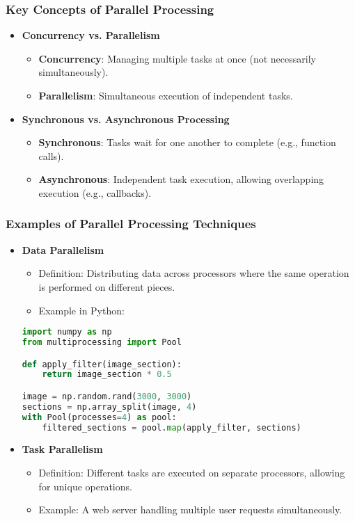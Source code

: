 \documentclass[aspectratio=169]{beamer}
\begin{document}
\begin{frame}
    \frametitle{Key Concepts of Parallel Processing}
    \begin{itemize}
        \item \textbf{Concurrency vs. Parallelism}
            \begin{itemize}
                \item \textbf{Concurrency}: Managing multiple tasks at once (not necessarily simultaneously).
                \item \textbf{Parallelism}: Simultaneous execution of independent tasks.
            \end{itemize}
        \item \textbf{Synchronous vs. Asynchronous Processing}
            \begin{itemize}
                \item \textbf{Synchronous}: Tasks wait for one another to complete (e.g., function calls).
                \item \textbf{Asynchronous}: Independent task execution, allowing overlapping execution (e.g., callbacks).
            \end{itemize}
    \end{itemize}
\end{frame}

\begin{frame}[fragile]
    \frametitle{Examples of Parallel Processing Techniques}
    \begin{itemize}
        \item \textbf{Data Parallelism}
            \begin{itemize}
                \item Definition: Distributing data across processors where the same operation is performed on different pieces.
                \item Example in Python:
            \end{itemize}
            \begin{lstlisting}[language=Python]
import numpy as np
from multiprocessing import Pool

def apply_filter(image_section):
    return image_section * 0.5

image = np.random.rand(3000, 3000)
sections = np.array_split(image, 4)
with Pool(processes=4) as pool:
    filtered_sections = pool.map(apply_filter, sections)
            \end{lstlisting}
        \item \textbf{Task Parallelism}
            \begin{itemize}
                \item Definition: Different tasks are executed on separate processors, allowing for unique operations.
                \item Example: A web server handling multiple user requests simultaneously.
            \end{itemize}
    \end{itemize}
\end{frame}
\end{document}
